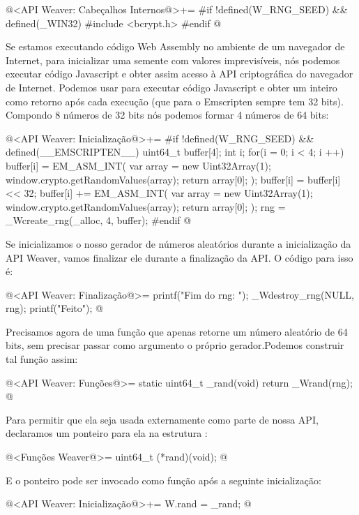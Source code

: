 \iniciocodigo
@<API Weaver: Cabeçalhos Internos@>+=
#if !defined(W_RNG_SEED) && defined(_WIN32)
#include <bcrypt.h>
#endif
@
\fimcodigo

Se estamos executando código Web Assembly no ambiente de um navegador
de Internet, para inicializar uma semente com valores imprevisíveis,
nós podemos executar código Javascript e obter assim acesso à API
criptográfica do navegador de Internet. Podemos
usar  para executar código Javascript e obter
um inteiro como retorno após cada execução (que para o Emscripten
sempre tem 32 bits). Compondo 8 números de 32 bits nós podemos formar
4 números de 64 bits:

\iniciocodigo
@<API Weaver: Inicialização@>+=
#if !defined(W_RNG_SEED) && defined(__EMSCRIPTEN__)
{
  uint64_t buffer[4];
  int i;
  for(i = 0; i < 4; i ++){
    buffer[i] = EM_ASM_INT({
      var array = new Uint32Array(1);
      window.crypto.getRandomValues(array);
      return array[0];
    });
    buffer[i] = buffer[i] << 32;
    buffer[i] += EM_ASM_INT({
      var array = new Uint32Array(1);
      window.crypto.getRandomValues(array);
      return array[0];
    });
  }
  rng = _Wcreate_rng(_alloc, 4, buffer);
}
#endif
@
\fimcodigo

Se inicializamos o nosso gerador de números aleatórios durante a
inicialização da API Weaver, vamos finalizar ele durante a finalização
da API. O código para isso é:

\iniciocodigo
@<API Weaver: Finalização@>=
printf("Fim do rng: \n");
_Wdestroy_rng(NULL, rng);
printf("Feito\n");
@
\fimcodigo

Precisamos agora de uma função que apenas retorne um número aleatório
de 64 bits, sem precisar passar como argumento o próprio
gerador.Podemos construir tal função assim:

\iniciocodigo
@<API Weaver: Funções@>=
static uint64_t _rand(void){
  return _Wrand(rng);
}
@
\fimcodigo

Para permitir que ela seja usada externamente como parte de nossa API,
declaramos um ponteiro para ela na estrutura :

\iniciocodigo
@<Funções Weaver@>=
uint64_t (*rand)(void);
@
\fimcodigo

E o ponteiro pode ser invocado como função após a seguinte
inicialização:

\iniciocodigo
@<API Weaver: Inicialização@>+=
W.rand = _rand;
@
\fimcodigo




